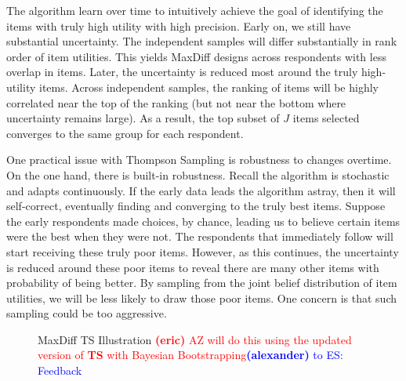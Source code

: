 \documentclass[nonblindrev]{informs3}
\newcommand{\alexander}[1]{\textcolor{blue}{\textbf{(alexander)} #1}}
\newcommand{\eric}[1]{\textcolor{red}{\textbf{(eric)} #1}}
\newcommand{\ts}{\textbf{TS} }
\begin{document}
The algorithm learn over time to intuitively achieve the goal of identifying the items with truly high utility with high precision. Early on, we still have substantial uncertainty. The independent samples will differ substantially in rank order of item utilities. This yields MaxDiff designs across respondents with less overlap in items. Later, the uncertainty is reduced most around the truly high-utility items. Across independent samples, the ranking of items will be highly correlated near the top of the ranking (but not near the bottom where uncertainty remains large). As a result, the top subset of $J$ items selected converges to the same group for each respondent. 

One practical issue with Thompson Sampling is robustness to changes overtime. On the one hand, there is built-in robustness. Recall the algorithm is stochastic and adapts continuously. If the early data leads the algorithm astray, then it will self-correct, eventually finding and converging to the truly best items. Suppose the early respondents made choices, by chance, leading us to believe certain items were the best when they were not. The respondents that immediately follow will start receiving these truly poor items. However, as this continues, the uncertainty is reduced around these poor items to reveal there are many other items with probability of being better. By sampling from the joint belief distribution of item utilities, we will be less likely to draw those poor items. One concern is that such sampling could be too aggressive.

\begin{figure}
\caption{MaxDiff TS Illustration \eric{AZ will do this using the updated version of \ts with Bayesian Bootstrapping}\alexander{to ES: Feedback} }
\label{fig:illustrate_ts}
	\begin{center}
    \qquad
    \end{center}
\end{figure}
\end{document}
